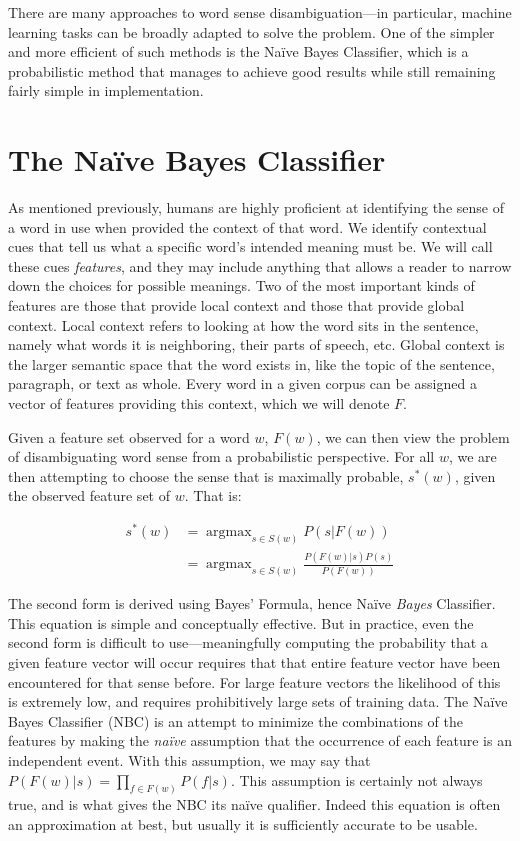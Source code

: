 \documentclass[11pt]{article}
\DeclareMathOperator*{\argmax}{argmax}
\begin{document}
There are many approaches to word sense disambiguation---in particular, machine learning tasks can be broadly adapted to solve the problem. One of the simpler and more efficient of such methods is the Na\"ive Bayes Classifier, which is a probabilistic method that manages to achieve good results while still remaining fairly simple in implementation.

\section{The Na\"ive Bayes Classifier}
As mentioned previously, humans are highly proficient at identifying the sense of a word in use when provided the context of that word. We identify contextual cues that tell us what a specific word's intended meaning must be. We will call these cues \emph{features}, and they may include anything that allows a reader to narrow down the choices for possible meanings. Two of the most important kinds of features are those that provide local context and those that provide global context. Local context refers to looking at how the word sits in the sentence, namely what words it is neighboring, their parts of speech, etc. Global context is the larger semantic space that the word exists in, like the topic of the sentence, paragraph, or text as whole. Every word in a given corpus can be assigned a vector of features providing this context, which we will denote $F$.

Given a feature set observed for a word $w$, $F(w)$, we can then view the problem of disambiguating word sense from a probabilistic perspective. For all $w$, we are then attempting to choose the sense that is maximally probable, $s^*(w)$, given the observed feature set of $w$. That is:

\begin{equation} \label{eq:fundamental}
\begin{split}
s^*(w) &= \argmax_{s \in S(w)} P(s|F(w)) \\
       &= \argmax_{s \in S(w)} \frac{P(F(w)|s)P(s)}{P(F(w))}
\end{split}
\end{equation}

The second form is derived using Bayes' Formula, hence Na\"ive \emph{Bayes} Classifier. This equation is simple and conceptually effective. But in practice, even the second form is difficult to use---meaningfully computing the probability that a given feature vector will occur requires that that entire feature vector have been encountered for that sense before. For large feature vectors the likelihood of this is extremely low, and requires prohibitively large sets of training data. The Na\"ive Bayes Classifier (NBC) is an attempt to minimize the combinations of the features by making the \emph{na\"ive} assumption that the occurrence of each feature is an independent event. With this assumption, we may say that ${P(F(w)|s) = \prod_{f \in F(w)} P(f|s)}$. This assumption is certainly not always true, and is what gives the NBC its na\"ive qualifier. Indeed this equation is often an approximation at best, but usually it is sufficiently accurate to be usable.
\end{document}
